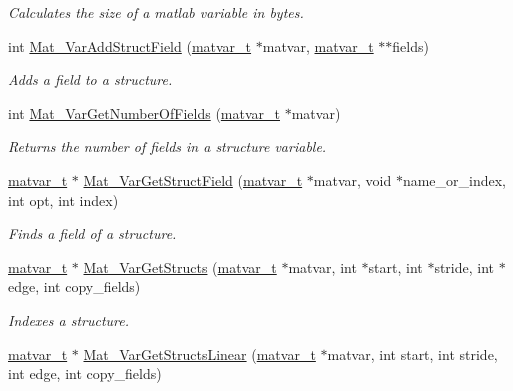 \begin{DoxyCompactItemize}
\begin{DoxyCompactList}\small\item\em Calculates the size of a matlab variable in bytes. \item\end{DoxyCompactList}\item 
int \hyperlink{group__MAT_ga9f8ab8a7e4206c16cb20437acc6960d2}{Mat\_\-VarAddStructField} (\hyperlink{structmatvar__t}{matvar\_\-t} $\ast$matvar, \hyperlink{structmatvar__t}{matvar\_\-t} $\ast$$\ast$fields)
\begin{DoxyCompactList}\small\item\em Adds a field to a structure. \item\end{DoxyCompactList}\item 
int \hyperlink{group__MAT_ga56b9a545990a0f253164018e37111741}{Mat\_\-VarGetNumberOfFields} (\hyperlink{structmatvar__t}{matvar\_\-t} $\ast$matvar)
\begin{DoxyCompactList}\small\item\em Returns the number of fields in a structure variable. \item\end{DoxyCompactList}\item 
\hyperlink{structmatvar__t}{matvar\_\-t} $\ast$ \hyperlink{group__MAT_ga7018bfe6934b96ae32e8f2a1712eefab}{Mat\_\-VarGetStructField} (\hyperlink{structmatvar__t}{matvar\_\-t} $\ast$matvar, void $\ast$name\_\-or\_\-index, int opt, int index)
\begin{DoxyCompactList}\small\item\em Finds a field of a structure. \item\end{DoxyCompactList}\item 
\hyperlink{structmatvar__t}{matvar\_\-t} $\ast$ \hyperlink{group__MAT_ga509178d7dc15faf9f7cd0440df6009b9}{Mat\_\-VarGetStructs} (\hyperlink{structmatvar__t}{matvar\_\-t} $\ast$matvar, int $\ast$start, int $\ast$stride, int $\ast$edge, int copy\_\-fields)
\begin{DoxyCompactList}\small\item\em Indexes a structure. \item\end{DoxyCompactList}\item 
\hyperlink{structmatvar__t}{matvar\_\-t} $\ast$ \hyperlink{group__MAT_gaa56680fb7b2cd3d410f659e945da8141}{Mat\_\-VarGetStructsLinear} (\hyperlink{structmatvar__t}{matvar\_\-t} $\ast$matvar, int start, int stride, int edge, int copy\_\-fields)
$$
\end{DoxyCompactItemize}
